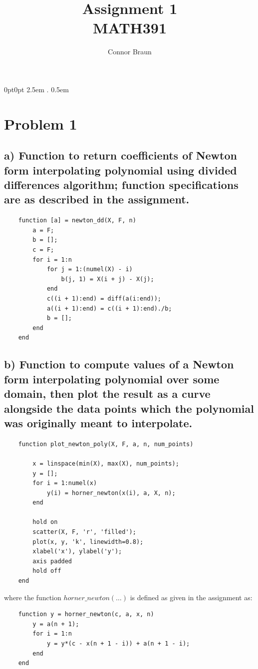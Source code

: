 \documentclass[11pt, letterpaper]{article}
\begin{document}
\title{Assignment 1\\\normalsize MATH391}
\author{Connor Braun}

\allowdisplaybreaks

\theoremstyle{definition}
\newtheorem*{prf}{Proof}
\newtheorem{recipe}{Recipe}
\newtheorem*{sol}{Solution}
\newtheorem{case}{Case}
    {0pt}{0pt}
    {\hangindent 2.5em}
    {}
    {\bfseries}
    {.}
    {0.5em}
    {}
\theoremstyle{mythrm}
\newtheorem{lemma}{Lemma}

\maketitle
\section*{Problem 1}

\subsection*{a) \normalfont Function to return coefficients of Newton form interpolating polynomial
using divided differences algorithm; function specifications are as described in the assignment.}
\begin{verbatim}
    function [a] = newton_dd(X, F, n)
        a = F;
        b = [];
        c = F;
        for i = 1:n
            for j = 1:(numel(X) - i)
                b(j, 1) = X(i + j) - X(j);
            end
            c((i + 1):end) = diff(a(i:end));
            a((i + 1):end) = c((i + 1):end)./b;
            b = [];
        end
    end
\end{verbatim}

\subsection*{b) \normalfont Function to compute values of a Newton form interpolating polynomial over 
some domain, then plot the result as a curve alongside the data points which the polynomial was originally 
meant to interpolate.}
\begin{verbatim}
    function plot_newton_poly(X, F, a, n, num_points)
        
        x = linspace(min(X), max(X), num_points);
        y = [];
        for i = 1:numel(x)
            y(i) = horner_newton(x(i), a, X, n);
        end
        
        hold on
        scatter(X, F, 'r', 'filled'); 
        plot(x, y, 'k', linewidth=0.8);
        xlabel('x'), ylabel('y');
        axis padded
        hold off
    end
\end{verbatim}
\newpage
where the function $horner\_newton(\dots)$ is defined as given in the assignment as:
\begin{verbatim}
    function y = horner_newton(c, a, x, n)
        y = a(n + 1);
        for i = 1:n
            y = y*(c - x(n + 1 - i)) + a(n + 1 - i);
        end
    end
\end{verbatim}
\end{document}
